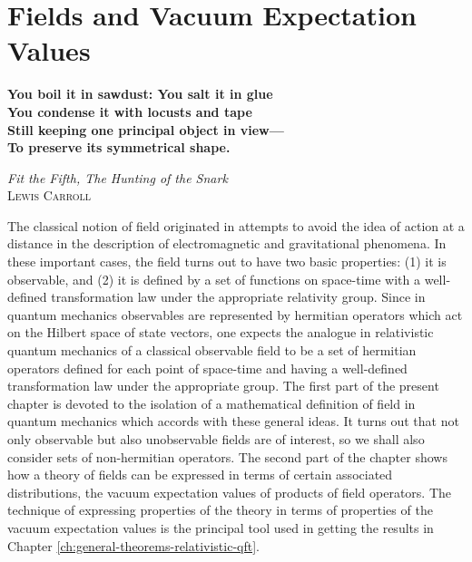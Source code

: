 \section{Fields and Vacuum Expectation Values}
\label{sec:ch3-fields-and-vacuum-expectation-values}

\begin{center}
\textbf{You boil it in sawdust: You salt it in glue\\
You condense it with locusts and tape\\
Still keeping one principal object in view---\\
To preserve its symmetrical shape.}

\medskip
\textit{Fit the Fifth, \textit{The Hunting of the Snark}}\\
\textsc{Lewis Carroll}
\end{center}

The classical notion of field originated in attempts to avoid the idea of
action at a distance in the description of electromagnetic and gravitational
phenomena. In these important cases, the field turns out to have two basic
properties: (1) it is observable, and (2) it is defined by a set of functions
on space-time with a well-defined transformation law under the appropriate
relativity group. Since in quantum mechanics observables are represented by
hermitian operators which act on the Hilbert space of state vectors, one
expects the analogue in relativistic quantum mechanics of a classical
observable field to be a set of hermitian operators defined for each point of
space-time and having a well-defined transformation law under the appropriate
group. The first part of the present chapter is devoted to the isolation of a
mathematical definition of field in quantum mechanics which accords with
these general ideas. It turns out that not only observable but also
unobservable fields are of interest, so we shall also consider sets of
non-hermitian operators. The second part of the chapter shows how a theory of
fields can be expressed in terms of certain associated distributions, the
vacuum expectation values of products of field operators. The technique of
expressing properties of the theory in terms of properties of the vacuum
expectation values is the principal tool used in getting the results in
Chapter \ref{ch:general-theorems-relativistic-qft}.
